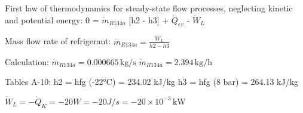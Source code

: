 First law of thermodynamics for steady-state flow processes, neglecting kinetic and potential energy:  
0 = \( \dot{m}_{R134a} \) [h2 - h3] + \( \dot{Q}_{ev} \) - \( \dot{W}_L \)  

Mass flow rate of refrigerant:  
\( \dot{m}_{R134a} = \frac{\dot{W}_L}{h2 - h3} \)  

Calculation:  
\( \dot{m}_{R134a} = 0.000665 \, \text{kg/s} \)  
\( \dot{m}_{R134a} = 2.394 \, \text{kg/h} \)  

Tables A-10:  
h2 = hfg (-22°C) = 234.02 kJ/kg  
h3 = hfg (8 bar) = 264.13 kJ/kg  

\( \dot{W}_L = -\dot{Q}_K = -20 W = -20 J/s = -20 \times 10^{-3} \, \text{kW} \)